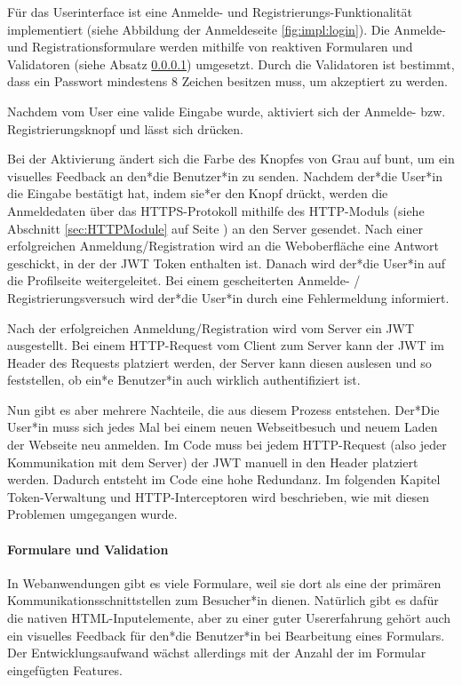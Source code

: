 Für das Userinterface ist eine Anmelde- und Registrierungs-Funktionalität implementiert (siehe Abbildung der Anmeldeseite \ref{fig:impl:login}). Die Anmelde- und Registrationsformulare werden mithilfe von reaktiven Formularen und Validatoren (siehe Absatz \ref{par:impl:usermanagment:reactiveForms}) umgesetzt.
Durch die Validatoren ist bestimmt, dass ein Passwort mindestens 8 Zeichen besitzen muss, um akzeptiert zu werden.

Nachdem vom User eine valide Eingabe wurde, aktiviert sich der Anmelde- bzw. Registrierungsknopf und lässt sich drücken.

Bei der Aktivierung ändert sich die Farbe des Knopfes von Grau auf bunt, um ein visuelles Feedback an den*die Benutzer*in zu senden. Nachdem der*die User*in die Eingabe bestätigt hat, indem sie*er den Knopf drückt, werden die Anmeldedaten über das HTTPS-Protokoll mithilfe des HTTP-Moduls (siehe Abschnitt \ref{sec:HTTPModule} auf Seite \pageref{sec:HTTPModule}) an den Server gesendet. Nach einer erfolgreichen Anmeldung/Registration wird an die Weboberfläche eine Antwort geschickt, in der der JWT Token enthalten ist. Danach wird der*die User*in auf die Profilseite weitergeleitet. Bei einem gescheiterten Anmelde- / Registrierungsversuch wird der*die User*in durch eine Fehlermeldung informiert.

Nach der erfolgreichen Anmeldung/Registration wird vom Server ein JWT ausgestellt. Bei einem HTTP-Request vom Client zum Server kann der JWT im Header des Requests platziert werden, der Server kann diesen auslesen und so feststellen, ob ein*e Benutzer*in auch wirklich authentifiziert ist.

Nun gibt es aber mehrere Nachteile, die aus diesem Prozess entstehen. Der*Die User*in muss sich jedes Mal bei einem neuen Webseitbesuch und neuem Laden der Webseite neu anmelden. Im Code muss bei jedem HTTP-Request (also jeder Kommunikation mit dem Server) der JWT manuell in den Header platziert werden. Dadurch entsteht im Code eine hohe Redundanz. Im folgenden Kapitel Token-Verwaltung und HTTP-Interceptoren wird beschrieben, wie mit diesen Problemen umgegangen wurde.

\paragraph{Formulare und Validation}
\label{par:impl:usermanagment:reactiveForms}
In Webanwendungen gibt es viele Formulare, weil sie dort als eine der primären Kommunikationsschnittstellen zum Besucher*in dienen. Natürlich gibt es dafür die nativen HTML-Inputelemente, aber zu einer guter Usererfahrung gehört auch ein visuelles Feedback für den*die Benutzer*in bei Bearbeitung eines Formulars. Der Entwicklungsaufwand wächst allerdings mit der Anzahl der im Formular eingefügten Features.

